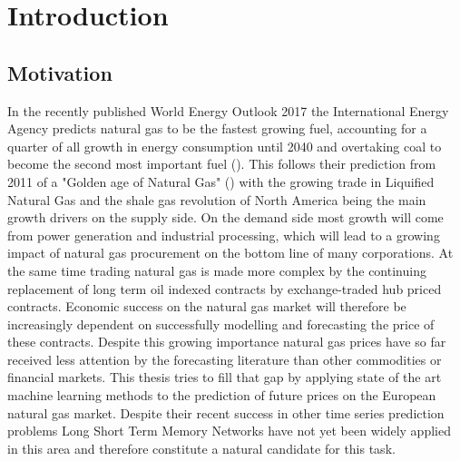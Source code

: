 \chapter{Introduction}
\section{Motivation}
In the recently published World Energy Outlook 2017 the International Energy Agency predicts natural gas to be the fastest growing fuel, accounting for a quarter of all growth in energy consumption until 2040 and overtaking coal to become the second most important fuel (\cite{iea_world_2017}). This follows their prediction from 2011 of a "Golden age of Natural Gas" (\cite{iea_world_2011}) with the growing trade in Liquified Natural Gas and the shale gas revolution of North America being the main growth drivers on the supply side. On the demand side most growth will come from power generation and industrial processing, which will lead to a growing impact of natural gas procurement on the bottom line of many corporations.  At the same time trading natural gas is made more complex by the continuing replacement of long term oil indexed contracts by exchange-traded hub priced contracts. Economic success on the natural gas market will therefore be increasingly dependent on successfully modelling and forecasting the price of these contracts. Despite this growing importance natural gas prices have so far received less attention by the forecasting literature than other commodities or financial markets. This thesis tries to fill that gap by applying state of the art machine learning methods to the prediction of future prices on the European natural gas market. Despite their recent success in other time series prediction problems Long Short Term Memory Networks have not yet been widely applied in this area and therefore constitute a natural candidate for this task. 
